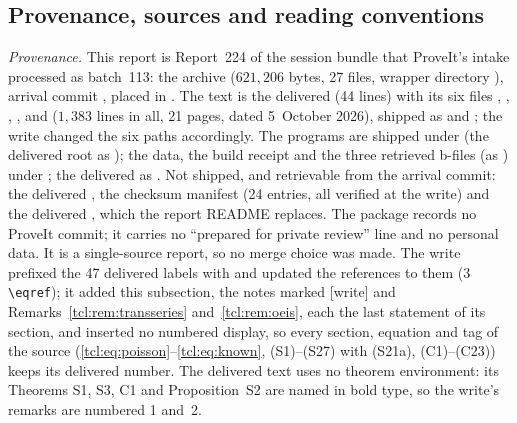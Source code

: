 \subsection{Provenance, sources and reading conventions}\label{tcl:sec:provenance}
\begin{writenote}\raggedright
\emph{Provenance.} This report is Report~224 of the session bundle that
ProveIt's  intake processed as batch~113: the archive
 ($621{,}206$ bytes, 27 files, wrapper directory
), arrival commit , placed in
. The text is the delivered  (44
lines) with its six \verb|| files ,
, , ,
 and  ($1{,}383$ lines in all, 21
pages, dated 5~October 2026), shipped as  and
; the write changed the six \verb|| paths
accordingly. The programs are shipped under  (the delivered root
 as ); the data, the build receipt
 and the three retrieved b-files (as
) under ; the delivered
 as . Not shipped, and
retrievable from the arrival commit: the delivered , the
checksum manifest  (24 entries, all verified at the
write) and the delivered , which the report README replaces.
The package records no ProveIt commit; it carries no ``prepared for private
review'' line and no personal data. It is a single-source report, so no merge
choice was made. The write prefixed the 47 delivered labels with
 and updated the references to them (3 \verb|\eqref|); it added this
subsection, the notes marked [write] and Remarks~\ref{tcl:rem:transseries}
and~\ref{tcl:rem:oeis}, each the last statement of its section, and inserted
no numbered display, so every section, equation and tag of the source
(\eqref{tcl:eq:poisson}--\eqref{tcl:eq:known}, (S1)--(S27) with (S21a), (C1)--(C23)) keeps
its delivered number. The delivered text uses no theorem environment: its
Theorems S1, S3, C1 and Proposition~S2 are named in bold type, so the write's
remarks are numbered 1 and~2.


\end{writenote}
